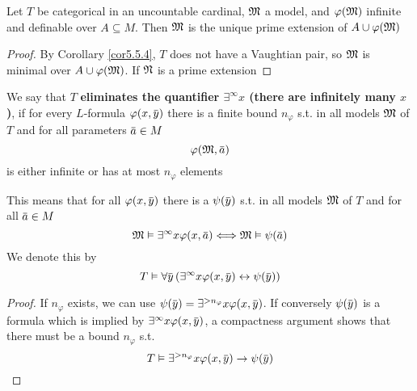 \documentclass[11pt]{article}
\begin{document}
\begin{corollary}[]
\label{cor5.5.5}
Let \(T\) be categorical in an uncountable cardinal, \(\mathfrak{M}\) a model, and \(\varphi(\mathfrak{M})\) infinite and
definable over \(A\subseteq M\). Then \(\mathfrak{M}\) is the unique prime extension of \(A\cup\varphi(\mathfrak{M})\)
\end{corollary}

\begin{proof}
By Corollary \ref{cor5.5.4}, \(T\) does not have a Vaughtian pair, so \(\mathfrak{M}\) is minimal
over \(A\cup\varphi(\mathfrak{M})\). If \(\mathfrak{N}\) is a prime extension
\end{proof}

\begin{definition}[]
We say that \(T\) \textbf{eliminates the quantifier \(\exists^\infty x\) (there are infinitely many \(x\))}, if for
every \(L\)-formula \(\varphi(x,\bary)\) there is a finite bound \(n_\varphi\) s.t. in all models \(\mathfrak{M}\)
of \(T\) and for all parameters \(\bara\in M\)
\begin{equation*}
\varphi(\fM,\bara)
\end{equation*}
is either infinite or has at most \(n_\varphi\) elements
\end{definition}

\begin{remark}
This means that for all \(\varphi(x,\bary)\) there is a \(\psi(\bary)\) s.t. in all models \(\mathfrak{M}\) of \(T\)
and for all \(\bara\in M\)
\begin{equation*}
\fM\vDash\exists^\infty x\varphi(x,\bara)\Longleftrightarrow\fM\vDash\psi(\bara)
\end{equation*}
We denote this by
\begin{equation*}
T\vDash\forall\bary\left( \exists^\infty x\varphi(x,\bary)\leftrightarrow\psi(\bary) \right)
\end{equation*}
\end{remark}

\begin{proof}
If \(n_\varphi\) exists, we can use \(\psi(\bary)=\exists^{>n_{\varphi}}x\varphi(x,\bary)\). If conversely \(\psi(\bary)\) is
a formula which is implied by \(\exists^\infty x\varphi(x,\bary)\), a compactness argument shows that there must
be a bound \(n_\varphi\) s.t.
\begin{equation*}
T\vDash\exists^{>n_\varphi}x\varphi(x,\bary)\to\psi(\bary)
\end{equation*}
\end{proof}
\end{document}

